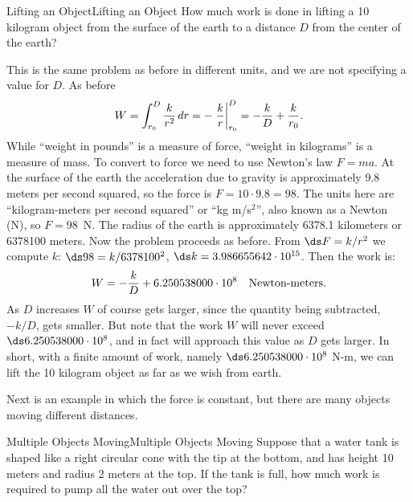 \begin{example}{Lifting an Object}{Lifting an Object}\label{Lifting an Object} 
How much work is done in lifting a 10 kilogram object from the
surface of the earth to a distance $D$ from the center of the earth?
\end{example}

\begin{solution}
This is the same problem as before in different units, and we are not
specifying a value for $D$. As before
$$W=\int_{r_0}^{D} {k\over r^2}\,dr= -\left.{k\over
  r}\right|_{r_0}^{D}=-{k\over D}+{k\over r_0}.$$ 
While ``weight in pounds'' is a measure of force, ``weight in
kilograms'' is a measure of mass. To convert to force we need to use
Newton's law $F=ma$. At the surface of the earth the acceleration due
to gravity is approximately 9.8 meters per second squared, so the
force is $F=10\cdot 9.8=98$. The units here are ``kilogram-meters per
second squared'' or ``kg m/s$^2$'', also known as a
Newton (N), so $F=98$~N.  The radius of the earth is
approximately 6378.1 kilometers or 6378100 meters.
Now the problem proceeds as before. From
$\ds F=k/r^2$ we compute $k$:
$\ds 98=k/6378100^2$, $\ds k= 3.986655642\cdot 10^{15}$. Then the work is:
$$W=-{k\over D}+6.250538000\cdot 10^8\quad\hbox{Newton-meters.}$$
As $D$ increases $W$ of course gets larger, since the quantity being
subtracted, $-k/D$, gets smaller. But note that the work $W$ will
never exceed $\ds 6.250538000\cdot 10^8$, and in fact will approach this
value as $D$ gets larger. In short, with a finite amount of work, namely
$\ds 6.250538000\cdot 10^8$ N-m, we can lift the 10 kilogram object as far
as we wish from earth.
\end{solution}

Next is an example in which the force is constant, but there are many
objects moving different distances.

\begin{example}{Multiple Objects Moving}{Multiple Objects Moving}\label{Multiple Objects Moving} 
Suppose that a water tank is shaped like a right circular
cone with the tip at the bottom, and has height 10 meters and radius 2
meters at the top. If the tank is full, how much work is required
to pump all the water out over the top? 
\end{example}

